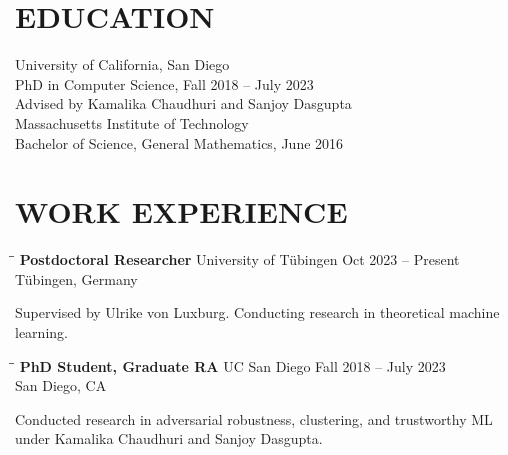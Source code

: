 \documentclass{res}
\begin{document}
 


\address{28 Quenstedtstrasse\\ Tübingen 72076, Germany}
\address{\bf CONTACT INFORMATION \\ robibhatt@gmail.com \\ robibhatt.github.io \\ github.com/robibhatt }
                                  
\begin{resume}
         
\section{EDUCATION} 
University of California, San Diego  \\        
\quad PhD in Computer Science, Fall 2018 – July 2023 \\
\quad Advised by Kamalika Chaudhuri and Sanjoy Dasgupta \\[1ex]
Massachusetts Institute of Technology  \\        
\quad Bachelor of Science, General Mathematics, June 2016 \\

\section{WORK EXPERIENCE}
\vspace{-0.1in}
\begin{tabbing}
\hspace{2.3in}\= \hspace{2.6in}\= \kill
{\bf Postdoctoral Researcher} \>University of Tübingen    \>Oct 2023 – Present\\
\>Tübingen, Germany
\end{tabbing}\vspace{-20pt}
Supervised by Ulrike von Luxburg. Conducting research in theoretical machine learning.  
\vspace{-0.1in}

\begin{tabbing}
\hspace{2.3in}\= \hspace{2.6in}\= \kill
{\bf PhD Student, Graduate RA} \>UC San Diego    \>Fall 2018 – July 2023\\
\>San Diego, CA
\end{tabbing}\vspace{-20pt}
Conducted research in adversarial robustness, clustering, and trustworthy ML under Kamalika Chaudhuri and Sanjoy Dasgupta.  
\vspace{-0.1in}


\end{resume}
\end{document}
